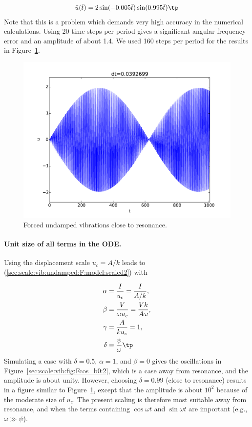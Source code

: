 \documentclass[graybox,envcountchap,sectrefs,final]{svmonodo}
\begin{document}
\[ \bar u(\bar t) = 2\sin(-0.005\bar t)\sin(0.995\bar t)\tp \]
Note that this is a problem which demands very high accuracy in the
numerical calculations. Using 20 time steps per period gives a
significant angular frequency error and an amplitude of about 1.4. We used
160 steps per period for the results in
Figure~\ref{sec:scale:vib:fig:Fcos_b0:1}.


\begin{figure}[!ht]  %
  \centerline{\includegraphics[width=1.0\linewidth]{fig-scaling/vib_delta099_b0_Fcos.pdf}}
  \caption{
  Forced undamped vibrations close to resonance. \label{sec:scale:vib:fig:Fcos_b0:1}
  }
\end{figure}


\paragraph{Unit size of all terms in the ODE.}
Using the displacement scale $u_c=A/k$ leads to
(\ref{sec:scale:vib:undamped:F:model:scaled2}) with

\begin{align*}
\alpha &= \frac{I}{u_c} = \frac{I}{A/k},\\ 
\beta  &= \frac{V}{\omega u_c} = \frac{V k}{A\omega},\\ 
\gamma &= \frac{A}{ku_c} = 1,\\ 
\delta &= \frac{\psi}{\omega}\tp
\end{align*}
Simulating a case with $\delta=0.5$, $\alpha=1$, and $\beta=0$ gives
the oscillations in Figure~\ref{sec:scale:vib:fig:Fcos_b0:2}, which is
a case away from resonance, and the amplitude is about unity. However,
choosing $\delta =0.99$ (close to resonance) results in a figure
similar to Figure~\ref{sec:scale:vib:fig:Fcos_b0:1}, except that the
amplitude is about $10^2$ because of the moderate size of $u_c$.
The present scaling is therefore most suitable away from resonance,
and when the terms containing $\cos\omega t$ and $\sin\omega t$
are important (e.g., $\omega\gg\psi$).
\end{document}
